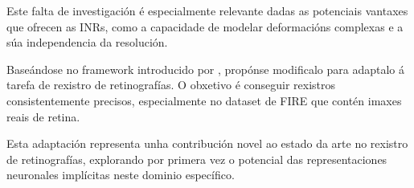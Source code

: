 Este falta de investigación é especialmente relevante dadas as potenciais vantaxes que ofrecen as INRs, como a capacidade de modelar deformacións complexas e a súa independencia da resolución.

Baseándose no framework introducido por \cite{wolterink2021implicit}, propónse modificalo para adaptalo á tarefa de rexistro de retinografías. O obxetivo é conseguir rexistros consistentemente precisos, especialmente no dataset de FIRE que contén imaxes reais de retina.

Esta adaptación representa unha contribución novel ao estado da arte no rexistro de retinografías, explorando por primera vez o potencial das representaciones neuronales implícitas neste dominio específico.
